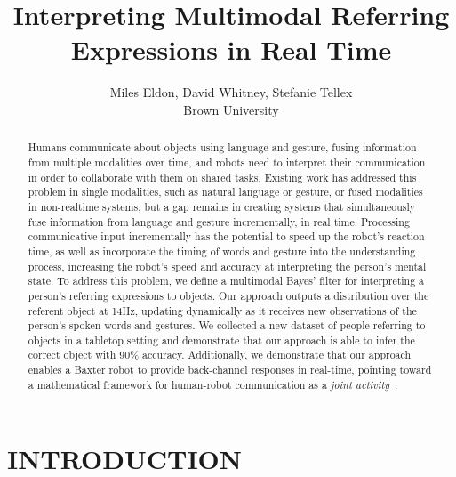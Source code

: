 \documentclass[letterpaper, 10 pt, conference]{ieeeconf}
\title{\LARGE \bf
Interpreting Multimodal Referring Expressions in Real Time}
\author{Miles Eldon, David Whitney, Stefanie Tellex\\Brown University}
\begin{document}
\maketitle
\thispagestyle{empty}
\pagestyle{empty}

\begin{abstract}
Humans communicate about objects using language and gesture, fusing
information from multiple modalities over time, and robots need to
interpret their communication in order to collaborate with them on
shared tasks.  Existing work has addressed this problem in single
modalities, such as natural language or gesture, or fused modalities
in non-realtime systems, but a gap remains in creating systems that
simultaneously fuse information from language and gesture
incrementally, in real time. Processing communicative input incrementally
has the potential to speed up the robot's reaction time, as well as
incorporate the timing of words and gesture into the understanding
process, increasing the robot's speed and accuracy at interpreting the
person's mental state.  To address this problem, we define a
multimodal Bayes' filter for interpreting a person's referring
expressions to objects.  Our approach outputs a distribution over the
referent object at 14Hz, updating dynamically as it receives new
observations of the person's spoken words and gestures.  We collected
a new dataset of people referring to objects in a tabletop setting and
demonstrate that our approach is able to infer the correct object with
90\% accuracy.  Additionally, we demonstrate that our approach enables
a Baxter robot to provide back-channel responses in real-time,
pointing toward a mathematical framework for human-robot communication
as a {\em joint activity}~\citep{clark96}.
\end{abstract}


\section{INTRODUCTION}
\end{document}
